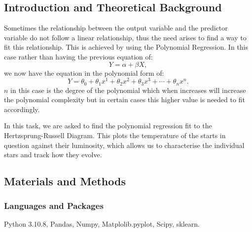 \documentclass[12pt, a4paper]{article}
\begin{document}
\subsection{Introduction and Theoretical Background}
Sometimes the relationship between the output variable and the predictor variable do not follow a linear relationship, thus the need arises to find a way to fit this relationship. This is achieved by using the Polynomial Regression. In this case rather than having the previous equation of:
\begin{equation}
    Y = \alpha + \beta X ,
\end{equation}
we now have the equation in the polynomial form of:
\begin{equation}
    Y = \theta_0 + \theta_1 x^1 + \theta_2 x^2 + \theta_3 x^3 + \cdots + \theta_n x^n .
\end{equation}
\(n\) in this case is the degree of the polynomial which when increases will increase the polynomial complexity but in certain cases this higher value is needed to fit accordingly.

In this task, we are asked to find the polynomial regression fit to the Hertzsprung-Russell Diagram. This plots the temperature of the starts in question against their luminosity, which allows us to characterise the individual stars and track how they evolve.

\subsection{Materials and Methods}
\subsubsection{Languages and Packages}
Python 3.10.8, Pandas, Numpy, Matplolib.pyplot, Scipy, sklearn.
\end{document}

